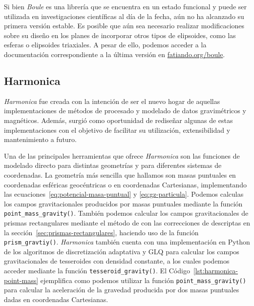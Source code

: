 Si bien \emph{Boule} es una librería que se encuentra en un estado funcional
y puede ser utilizada en investigaciones científicas al día de la fecha, aún no
ha alcanzado su primera versión estable.
Es posible que aún sea necesario realizar modificaciones sobre su diseño en los
planes de incorporar otros tipos de elipsoides, como las esferas o elipsoides
triaxiales.
A pesar de ello, podemos acceder a la documentación correspondiente a la última
versión en \href{https://www.fatiando.org/boule}{fatiando.org/boule}.


\subsection{Harmonica}

\emph{Harmonica} fue creada con la intención de ser el nuevo hogar de aquellas
implementaciones de métodos de procesado y modelado de datos gravimétricos
y magnéticos.
Además, surgió como oportunidad de rediseñar algunas de estas implementaciones
con el objetivo de facilitar su utilización, extensibilidad y mantenimiento
a futuro.

Una de las principales herramientas que ofrece \emph{Harmonica} son las
funciones de modelado directo para distintas geometrías y para diferentes
sistemas de coordenadas.
La geometría más sencilla que hallamos son masas puntuales en coordenadas
esféricas geocéntricas o en coordenadas Cartesianas, implementando las
ecuaciones~\ref{eq:potencial-masa-puntual} y \ref{eq:gz-particula}.
Podemos calculas los campos gravitacionales producidos por masas puntuales
mediante la función \texttt{point\_mass\_gravity()}.
También podemos calcular los campos gravitacionales de prismas rectangulares
mediante el método de \citet{nagy2000} con las correcciones de
\citet{fukushima2020} descriptas en la sección~\ref{sec:prismas-rectangulares},
haciendo uso de la función \texttt{prism\_gravtiy()}.
\emph{Harmonica} también cuenta con una implementación en Python de los
algoritmos de discretización adaptativa y \ac{GLQ} para calcular los campos
gravitacionales de tesseroides con densidad constante, a los cuales podemos
acceder mediante la función \texttt{tesseroid\_gravity()}.
El Código~\ref{lst:harmonica-point-mass} ejemplifica como podemos utilizar la
función \texttt{point\_mass\_gravity()} para calcular la aceleración de la
gravedad producida por dos masas puntuales dadas en coordenadas Cartesianas.



